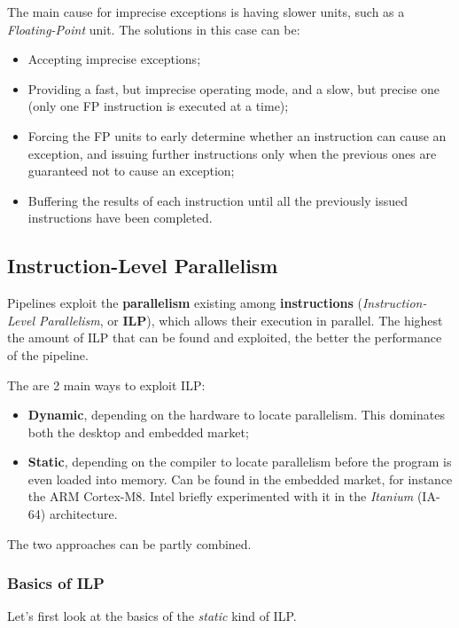 \documentclass[a4paper,11pt]{article}
\begin{document}
The main cause for imprecise exceptions is having slower units, such as a \textit{Floating-Point} unit.
The solutions in this case can be:
\begin{itemize}
	\item Accepting imprecise exceptions;
	\item Providing a fast, but imprecise operating mode, and a slow, but precise one (only one FP instruction is executed at a time);
	\item Forcing the FP units to early determine whether an instruction can cause an exception, and issuing further instructions only when the previous ones are guaranteed not to cause an exception;
	\item Buffering the results of each instruction until all the previously issued instructions have been completed.
\end{itemize}

\subsection{Instruction-Level Parallelism}

Pipelines exploit the \textbf{parallelism} existing among \textbf{instructions} (\textit{Instruction-Level Parallelism}, or \textbf{ILP}), which allows their execution in parallel.
The highest the amount of ILP that can be found and exploited, the better the performance of the pipeline.

The are 2 main ways to exploit ILP:
\begin{itemize}
	\item \textbf{Dynamic}, depending on the hardware to locate parallelism. This dominates both the desktop and embedded market;
	\item \textbf{Static}, depending on the compiler to locate parallelism before the program is even loaded into memory. Can be found in the embedded market, for instance the ARM Cortex-M8. Intel briefly experimented with it in the \textit{Itanium} (IA-64) architecture.
\end{itemize}

The two approaches can be partly combined.

\subsubsection{Basics of ILP}

Let's first look at the basics of the \textit{static} kind of ILP.
\end{document}
